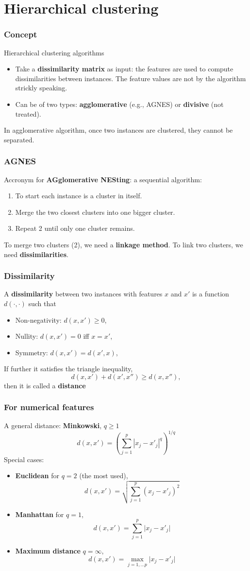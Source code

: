 \section{Hierarchical clustering}
\begin{frame}
\frametitle{Concept}
Hierarchical clustering algorithms
\begin{itemize}
\item Take a {\bf dissimilarity matrix} as input: the features are used to compute dissimilarities between instances. The feature values are not by the algorithm strickly speaking.  
\item Can be of two types: {\bf agglomerative} (e.g., AGNES) or {\bf divisive} (not treated). 
\end{itemize}
In agglomerative algorithm, once two instances are clustered, they cannot be separated.
\end{frame}
\begin{frame}
\frametitle{AGNES}
Accronym for {\bf AGglomerative NESting}: a sequential algorithm: 
\begin{enumerate}
\item To start each instance is a cluster in itself. 
\item Merge the two closest clusters into one bigger cluster.
\item Repeat 2 until only one cluster remains.
\end{enumerate}
To merge two clusters (2), we need a {\bf linkage method}. To link two clusters, we need {\bf dissimilarities}.
\end{frame}
\begin{frame}
\frametitle{Dissimilarity}
A {\bf dissimilarity} between two instances with features $x$ and $x'$ is a function $d(\cdot, \cdot)$ such that
\begin{itemize}
\item Non-negativity: $d(x,x')\geq 0$,
\item Nullity: $d(x,x') = 0$ iff $x=x'$,
\item Symmetry: $d(x,x') = d(x',x)$,
\end{itemize}
If further it satisfies the triangle inequality, 
$$
d(x, x') + d(x', x'') \geq d(x, x''),
$$
then it is called a {\bf distance}
\end{frame}
\begin{frame}
\frametitle{For numerical features}
A general distance: {\bf Minkowski}, $q \geq 1$
$$
d(x,x') = \left(\sum_{j=1}^p |x_j - x'_j|^q\right)^{1/q}
$$
\scriptsize
Special cases:
\begin{itemize}
\item {\bf Euclidean} for $q=2$ (the most used),
$$
d(x,x') = \sqrt{\sum_{j=1}^p (x_{j} - x'_{j})^2}
$$
\item {\bf Manhattan} for $q=1$, 
$$
d(x,x') = \sum_{j=1}^p \vert x_j - x'_j \vert
$$
\item {\bf Maximum distance} $q=\infty$, 
$$
d(x,x') = \max_{j=1,\ldots p} \vert x_j - x'_j\vert
$$
\end{itemize}
\normalsize
\end{frame}
